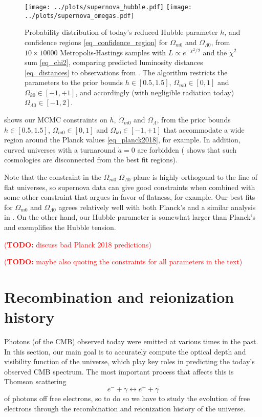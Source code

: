 \documentclass[10pt,a4paper]{article}
\newcommand\TODO[1]{\textcolor{red}{(\textbf{TODO:} #1)}}
\begin{document}
\begin{figure}[b]
	\centering
	\texttt{[image: ../plots/supernova\_hubble.pdf]}
	\texttt{[image: ../plots/supernova\_omegas.pdf]}
	\caption{%
		Probability distribution of today's reduced Hubble parameter $h$,
		and confidence regions \eqref{eq_confidence_region} for $\Omega_{m0}$ and $\Omega_{\Lambda0}$,
		from $10 \times 10000$ Metropolis-Hastings samples with $L \propto e^{-\chi^2/2}$ and the $\chi^2$ sum \eqref{eq_chi2},
		comparing predicted luminosity distances \eqref{eq_distances} to observations from \cite{betouleImprovedCosmologicalConstraints2014}.
		The algorithm restricts the parameters to the prior bounds $h \in [0.5, 1.5]$, $\Omega_{m0} \in [0, 1]$ and $\Omega_{k0} \in [-1, +1]$, and accordingly (with negligible radiation today) $\Omega_{\Lambda0} \in [-1, 2]$.
	}
	\label{fig_supernova_mcmc}
\end{figure}

 shows our MCMC constraints on $h$, $\Omega_{m0}$ and $\Omega_\Lambda$,
from the prior bounds $h \in [0.5, 1.5]$, $\Omega_{m0} \in [0, 1]$ and $\Omega_{k0} \in [-1, +1]$
that accommodate a wide region around the Planck values \eqref{eq_planck2018}, for example.
In addition, curved universes with a turnaround $\dot{a} = 0$ are forbidden
(\cite[Figure 11]{amanullahSpectraLightCurves2010} shows that such cosmologies are disconnected from the best fit regions).

Note that the constraint in the $\Omega_{m0}$-$\Omega_{\Lambda0}$-plane is highly orthogonal to the line of flat universes,
so supernova data can give good constraints when combined with some other constraint that argues in favor of flatness, for example.
Our best fits for $\Omega_{m0}$ and $\Omega_{\Lambda0}$ agrees relatively well with both Planck's and a similar analysis in \cite[Fig. 15]{betouleImprovedCosmologicalConstraints2014}.
On the other hand, our Hubble parameter is somewhat larger than Planck's and exemplifies the Hubble tension.

\TODO{discuss bad Planck 2018 predictions}

\TODO{maybe also quoting the constraints for all parameters in the text}

\clearpage
\section{Recombination and reionization history}

Photons (of the CMB) observed today were emitted at various times in the past.
In this section, our main goal is to accurately compute the optical depth and visibility function of the universe,
which play key roles in predicting the today's observed CMB spectrum.
The most important process that affects this is Thomson scattering
\begin{equation}
	e^- + \gamma \leftrightarrow e^- + \gamma
\label{eq_thomson_scattering}
\end{equation}
of photons off free electrons,
so to do so we have to study the evolution of free electrons through the recombination and reionization history of the universe.
\end{document}
